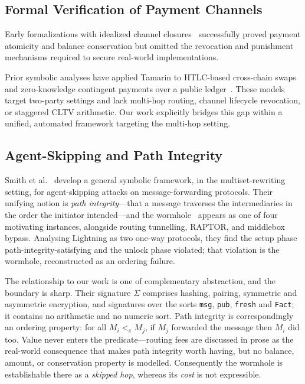 \documentclass[sigconf,review]{acmart}
\theoremstyle{acmdefinition}
\begin{document}
\subsection{Formal Verification of Payment Channels}
Early formalizations with idealized channel closures~\cite{decker2015fast, malavolta2017concurrency, miller2019sprites} successfully proved payment atomicity and balance conservation but omitted the revocation and punishment mechanisms required to secure real-world implementations.

Prior symbolic analyses have applied Tamarin to HTLC-based cross-chain swaps~\cite{boyd2020blockchain} and zero-knowledge contingent payments over a public ledger~\cite{bursuc2019contingent}. These models target two-party settings and lack multi-hop routing, channel lifecycle revocation, or staggered CLTV arithmetic. Our work explicitly bridges this gap within a unified, automated framework targeting the multi-hop setting.

\subsection{Agent-Skipping and Path Integrity}
Smith et al.~\cite{smith2022modelling} develop a general symbolic framework, in the multiset-rewriting setting, for agent-skipping attacks on message-forwarding protocols. Their unifying notion is \emph{path integrity}---that a message traverses the intermediaries in the order the initiator intended---and the wormhole~\cite{malavolta2019anonymous} appears as one of four motivating instances, alongside routing tunnelling, RAPTOR, and middlebox bypass. Analysing Lightning as two one-way protocols, they find the setup phase path-integrity-satisfying and the unlock phase violated; that violation is the wormhole, reconstructed as an ordering failure.

The relationship to our work is one of complementary abstraction, and the boundary is sharp. Their signature $\Sigma$ comprises hashing, pairing, symmetric and asymmetric encryption, and signatures over the sorts \texttt{msg}, \texttt{pub}, \texttt{fresh} and \texttt{Fact}; it contains no arithmetic and no numeric sort. Path integrity is correspondingly an ordering property: for all $M_i <_\pi M_j$, if $M_j$ forwarded the message then $M_i$ did too. Value never enters the predicate---routing fees are discussed in prose as the real-world consequence that makes path integrity worth having, but no balance, amount, or conservation property is modelled. Consequently the wormhole is establishable there as a \emph{skipped hop}, whereas its \emph{cost} is not expressible.
\end{document}
